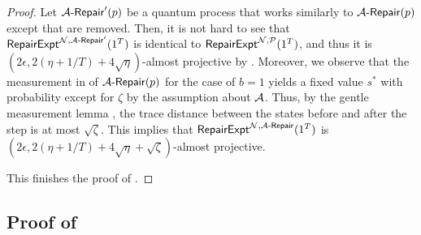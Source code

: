 \begin{proof}
Let $\mathcal{A}\text{-}\mathsf{Repair}'(p)$ be a quantum process that works similarly to $\mathcal{A}\text{-}\mathsf{Repair}(p)$ except that  are removed. 
Then, it is not hard to see that $\mathsf{RepairExpt}^{\mathcal{N},\mathcal{A}\text{-}\mathsf{Repair}'}(1^T)$ is identical to 
$\mathsf{RepairExpt}^{\mathcal{N},\mathcal{P}}(1^T)$, and thus it is $(2\epsilon,2(\eta+1/T)+4\sqrt{\eta})$-almost projective by . 
Moreover, we observe that the measurement in  of $\mathcal{A}\text{-}\mathsf{Repair}(p)$ for the case of $b=1$ yields a fixed value $s^*$ with probability except for $\zeta$ by the assumption about $\mathcal{A}$. Thus, by the gentle measurement lemma \cite[Lemma 2.2]{DBLP:journals/toc/Aaronson05}, the trace distance between the states before and after the step is at most $\sqrt{\zeta}$.    
This implies that $\mathsf{RepairExpt}^{\mathcal{N},\mathcal{A}\text{-}\mathsf{Repair}}(1^T)$  is $(2\epsilon,2(\eta+1/T)+4\sqrt{\eta}+\sqrt{\zeta})$-almost projective.

This finishes the proof of .
\end{proof}

\subsection{Proof of }

